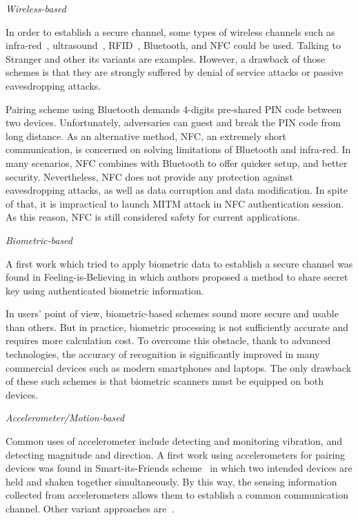 \emph{Wireless-based}

In order to establish a secure channel, some types of wireless channels such as infra-red~\cite{5654588}, ultrasound~\cite{Mayrhofer06anauthentication}, RFID~\cite{Amariucai:2012aa}, Bluetooth, and NFC could be used. Talking to Stranger and other its variants \cite{5654588,Mayrhofer06anauthentication,4159919,Amariucai:2012aa} are examples. However, a drawback of those schemes is that they are strongly suffered by denial of service attacks or passive eavesdropping attacks. 

Pairing scheme using Bluetooth demands 4-digits pre-shared PIN code between two devices. Unfortunately, adversaries can guest and break the PIN code from long distance. As an alternative method, NFC, an extremely short communication, is concerned on solving limitations of Bluetooth and infra-red. In many scenarios, NFC combines with Bluetooth to offer quicker setup, and better security. Nevertheless, NFC does not provide any protection against eavesdropping attacks, as well as data corruption and data modification. In spite of that, it is impractical to launch MITM attack in NFC authentication session. As this reason, NFC is still considered safety for current applications. 

\emph{Biometric-based}

A first work which tried to apply biometric data to establish a secure channel was found in Feeling-is-Believing \cite{Buhan_feelingis} in which authors proposed a method to share secret key using authenticated biometric information. 

In users' point of view, biometric-based schemes sound more secure and usable than others. But in practice, biometric processing is not sufficiently accurate and requires more calculation cost. To overcome this obstacle, thank to advanced technologies, the accuracy of recognition is significantly improved in many commercial devices such as modern smartphones and laptops. The only drawback of these such schemes is that biometric scanners must be equipped on both devices. 

\emph{Accelerometer/Motion-based}

Common uses of accelerometer include detecting and monitoring vibration, and detecting magnitude and direction. A first work using accelerometers for pairing devices was found in Smart-its-Friends scheme~\cite{Holmquist:2001kl} in which two intended devices are held and shaken together simultaneously. By this way, the sensing information collected from accelerometers allows them to establish a common communication channel. Other variant approaches are~\cite{Lester04areyou,Mayrhofer:2007oq,Studer:2011:DBS:2076732.2076780,Groza:2012:SSA:,Chong:2010:GUD:1851600.1851644, Chagnaadorj:2013aa}.

